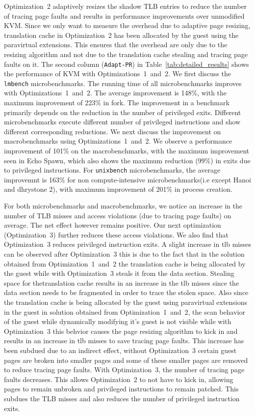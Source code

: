 Optimization~2 adaptively resizes the shadow TLB entries to reduce the number of tracing page faults and results in performance improvements over unmodified KVM. Since we only want to measure the overhead due to adaptive page resizing, translation cache in Optimization~2 has been allocated by the guest using the paravirtual extensions. This ensures that the overhead are only due to the resizing algorithm and not due to the translation cache stealing and tracing page faults on it. The second column ({\tt Adapt-PR}) in Table~\ref{tab:detailed_results} shows the performance of KVM with Optimizations~1~and~2. We first discuss the {\tt lmbench} microbenchmarks. The running time of all microbenchmarks improves with Optimizations~1~and~2. The average improvement is 148\%, with the maximum improvement of 223\% in fork. The improvement in a benchmark primarily depends on the reduction in the number of privileged exits. Different microbenchmarks execute different number of privileged instructions and show different corresponding reductions. We next discuss the improvement on macrobenchmarks using Optimizations~1~and~2. We observe a performance improvement of 101\% on the macrobenchmarks, with the maximum improvement seen in Echo Spawn, which also shows the maximum reduction (99\%) in exits due to privileged instructions. For {\tt unixbench} microbenchmarks, the average improvemnt is 163\% for non compute-intensive microbenchmarks(i.e except Hanoi and dhrystone 2), with maximum improvement of 201\%  in process creation. 

For both microbenchmarks and macrobenchmarks, we notice an increase in the number of TLB misses and access violations (due to tracing page faults) on average. The net effect however remains positive. Our next optimization (Optimization~3) further reduces these access violations. We also find that Optimization~3 reduces privileged instruction exits. A slight increase in tlb misses can be observed after Optimization~3 this is due to the fact that in the solution obtained from Optimization~1~and~2  the translation cache is being allocated by the guest while with Optimization~3 steals it from the data section. Stealing space for thetranslation cache results in an increase in the tlb misses since the data section needs to be fragmented in order to trace the stolen space. Also since the translation cache is being allocated by the guest using paravirtual extensions in the guest in solution obtained from Optimization~1~and~2, the scan behavior of the guest while dynamically modifying it's guest is not visible while with Optimization~3 this behvior causes the page resizing algorithm to kick in and results in an increase in tlb misses to save tracing page faults.
This increase has been subdued due to an indirect effect, without Optimization~3 certain guest pages are broken into smaller pages and some of these smaller pages are removed to reduce tracing page faults. With Optimization~3, the number of tracing page faults decreases. This allows Optimization~2 to not have to kick in, allowing pages to remain unbroken and privileged instructions to remain patched. This subdues the TLB misses and also reduces the number of privileged instruction exits. 

